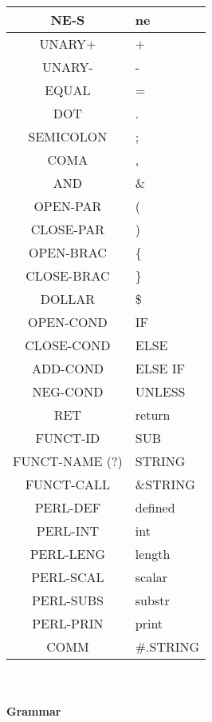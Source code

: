 \documentclass[a4paper,10pt]{article}
\begin{document}
\begin{longtable}{|c|l|}
NE-S				& ne \\ \hline
UNARY+				& + \\ \hline
UNARY-				& - \\ \hline
EQUAL				& = \\ \hline
DOT					& . \\ \hline
SEMICOLON			& ; \\ \hline
COMA				& , \\ \hline
AND					& \& \\ \hline
OPEN-PAR			& ( \\ \hline
CLOSE-PAR			& ) \\ \hline
OPEN-BRAC			& \{ \\ \hline
CLOSE-BRAC			& \} \\ \hline
DOLLAR				& \$ \\ \hline
OPEN-COND			& IF \\ \hline
CLOSE-COND 			& ELSE \\ \hline
ADD-COND			& ELSE IF \\ \hline
NEG-COND			& UNLESS \\ \hline
RET					& return \\ \hline
FUNCT-ID			& SUB \\ \hline
FUNCT-NAME (?)		& STRING \\ \hline 
FUNCT-CALL			& \&STRING \\ \hline
PERL-DEF			& defined  \\ \hline
PERL-INT			& int  \\ \hline
PERL-LENG			& length  \\ \hline
PERL-SCAL			& scalar  \\ \hline
PERL-SUBS			& substr  \\ \hline
PERL-PRIN			& print\\ \hline
COMM				& \#.STRING \\ \hline


\end{longtable}


\pagebreak
~\\
\paragraph{Grammar}
\end{document}
